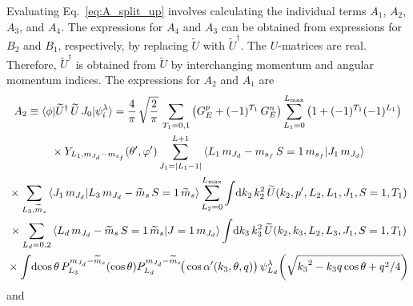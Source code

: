  Evaluating Eq.~\eqref{eq:A_split_up} involves calculating the individual terms
  $A_1$, $A_2$, $A_3$, and $A_4$.  The expressions for $A_4$ and $A_3$ can be
  obtained from expressions for $B_2$ and $B_1$, respectively, by replacing
  $\widetilde{U}$ with $\widetilde{U}^\dag$.  The $U$-matrices are real.
  Therefore, $\widetilde{U}^\dag$ is obtained from $\widetilde{U}$ by
  interchanging momentum and angular momentum indices.  The expressions for
  $A_2$ and $A_1$ are
  \begin{multline}
   A_2 \equiv \la \phi | \widetilde{U}^\dag \, \widetilde{U}\, J_0 |
   \psi_i^\lambda \ra  = \frac{4}{\pi} \, \sqrt{\frac{2}{\pi}} \,
   \sum_{T_1 = 0,1} \big(G_E ^p + (-1)^{T_1} \, G_E^n\big)
   \sum_{L_1 = 0}^{L_{\rm max}} \big(1 + (-1)^{T_1} (-1)^{L_1}\big) \\
   \null \times  Y_{L_1 , \mJd - \msf} (\thetacm, \phicm)
   \sum_{J_1 = |L_1 - 1|}^{L+1}
   \CG{L_1}{\mJd-\msf}{S=1}{\msf}{J_1}{\mJd} \\
   \null \times
   \sum_{L_3, \widetilde{m}_s}
   \braket{J_1 \, \mJd}{L_3 \, \mJd - \wt{m}_s \, S=1 \, \wt{m}_s}
   \sum_{L_2 = 0}^{L_{\rm max}} \int \! \dd k_2 \, k_2^2 \,
   \widetilde{U} (k_2, \pp, L_2, L_1, J_1, S=1, T_1) \\
   \null \times
   \sum_{L_d = 0, 2}
   \CG{L_d}{\mJd-\widetilde{m}_s}{S=1}{\widetilde{m}_s}{J=1}{\mJd}
   \int \! \dd k_3 \, k_3^2 \,
   \widetilde{U} (k_2, k_3, L_2, L_3, J_1, S = 1, T_1) \\
   \null \times
   \int \! \dcostheta \,P_{L_3}^{\mJd - \widetilde{m}_s}(\cos\theta)
   P_{L_d}^{\mJd - \widetilde{m}_s}\!\big(
   \cos\thetacprime(k_3, \theta, q)\big) \,
   \psi_{L_d}^\lambda\!\left(\sqrt{{k_3}^2 - k_3 q \cos\theta + q^2/4} \right)
  \end{multline}
  and
